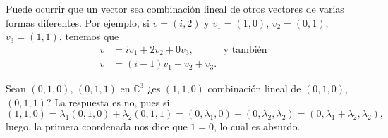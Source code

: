 \documentclass[handout]{beamer} %
\newcommand{\C}{\mathbb C}
\begin{document}
\begin{frame}

\begin{ejemplo}
    Puede ocurrir que un vector sea combinación lineal de otros vectores de varias formas diferentes. Por ejemplo,   si   $v = (i,2)$ y $v_1 = (1,0)$, $v_2 = (0,1)$, $v_3 = (1,1)$,  tenemos que
        \begin{align*}
            v &= iv_1+2v_2+0v_3,\quad\quad\quad\text{y también}\\
            v &= (i-1)v_1 + v_2 + v_3.  
        \end{align*}
\end{ejemplo}
\pause
\begin{ejemplo}
        Sean $(0,1,0)$, $(0,1,1)$ en $\C^3$ ¿es $(1,1,0)$ combinación lineal de $(0,1,0)$, $(0,1,1)$? La respuesta es no, pues si 
        $$
        (1,1,0) = \lambda_1(0,1,0)+ \lambda_2(0,1,1) = (0,\lambda_1,0)+ (0,\lambda_2,\lambda_2) = (0,\lambda_1+\lambda_2,\lambda_2),
        $$ 
        luego, la primera coordenada nos dice que $1=0$, lo cual es absurdo. 
        
\end{ejemplo}
    
    
\end{frame}
    
\end{document}
